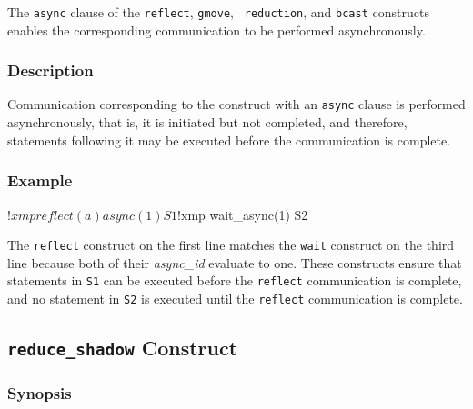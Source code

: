 The {\tt async} clause of the {\tt reflect}, {\tt gmove}, {\tt
reduction}, and {\tt bcast} constructs enables the corresponding
communication to be performed asynchronously.

\subsubsection*{Description}

Communication corresponding to the construct with an {\tt async} clause
is performed asynchronously, that is, it is initiated but not completed,
and therefore, statements following it may be executed before the
communication is complete.

%

\subsubsection*{Example}

\begin{XFexample}
!$xmp reflect (a) async(1)
      S1
!$xmp wait_async(1)
      S2
\end{XFexample}

The {\tt reflect} construct on the first line matches the {\tt wait}
construct on the third line because both of their {\it async\_id}
evaluate to one.
%
These constructs ensure that statements in {\tt S1} can be executed
before the {\tt reflect} communication is complete, and no statement in
{\tt S2} is executed until the {\tt reflect} communication is
complete.


\subsection{{\tt reduce\_shadow} Construct}
\label{154624_16Jan17}

\subsubsection*{Synopsis}


